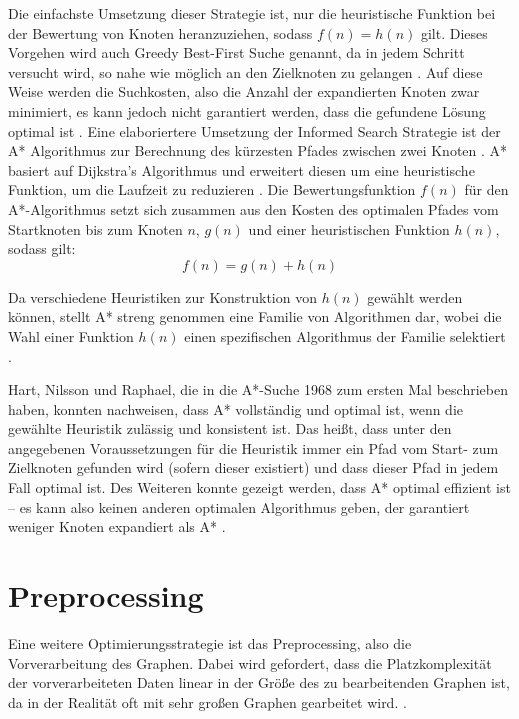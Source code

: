 Die einfachste Umsetzung dieser Strategie ist, nur die heuristische Funktion bei der Bewertung von Knoten heranzuziehen, sodass $f(n)=h(n)$ gilt. Dieses Vorgehen wird auch Greedy Best-First Suche genannt, da in jedem Schritt versucht wird, so nahe wie möglich an den Zielknoten zu gelangen \cite[92-102]{Russell:10}. Auf diese Weise werden die Suchkosten, also die Anzahl der expandierten Knoten zwar minimiert, es kann jedoch nicht garantiert werden, dass die gefundene Lösung optimal ist \cite[92-102]{Russell:10}.
\label{A*}
Eine elaboriertere Umsetzung der Informed Search Strategie ist der A* Algorithmus zur Berechnung des kürzesten Pfades zwischen zwei Knoten \cite[92-102]{Russell:10}. A* basiert auf Dijkstra’s Algorithmus und erweitert diesen um eine heuristische Funktion, um die Laufzeit zu reduzieren \cite{Peralta2020}. Die Bewertungsfunktion $f(n)$ für den A*-Algorithmus setzt sich zusammen aus den Kosten des optimalen Pfades vom Startknoten bis zum Knoten $n$, $g(n)$ und einer heuristischen Funktion $h(n)$, sodass gilt:
\begin{equation} \label{eq:3.1}
	f(n)=g(n)+h(n)
\end{equation}

Da verschiedene Heuristiken zur Konstruktion von $h(n)$ gewählt werden können, stellt A* streng genommen eine Familie von Algorithmen dar, wobei die Wahl einer Funktion $h(n)$ einen spezifischen Algorithmus der Familie selektiert \cite{Hart1968}. 

Hart, Nilsson und Raphael, die in \cite{Hart1968} die A*-Suche 1968 zum ersten Mal beschrieben haben, konnten nachweisen, dass A* vollständig und optimal ist, wenn die gewählte Heuristik zulässig und konsistent ist. Das heißt, dass unter den angegebenen Voraussetzungen für die Heuristik immer ein Pfad vom Start- zum Zielknoten gefunden wird (sofern dieser existiert) und dass dieser Pfad in jedem Fall optimal ist. Des Weiteren konnte gezeigt werden, dass A* optimal effizient ist – es kann also keinen anderen optimalen Algorithmus geben, der garantiert weniger Knoten expandiert als A* \cite[92-102]{Russell:10}.

\section{Preprocessing}
Eine weitere Optimierungsstrategie ist das Preprocessing, also die Vorverarbeitung des Graphen. Dabei wird gefordert, dass die Platzkomplexität der vorverarbeiteten Daten linear in der Größe des zu bearbeitenden Graphen ist, da in der Realität oft mit sehr großen Graphen gearbeitet wird. \cite{Goldberg2005}. 

